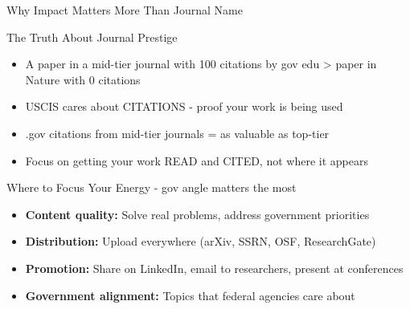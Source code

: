 \documentclass[11pt]{beamer}
\begin{document}
	\begin{frame}{Why Impact Matters More Than Journal Name}
		\scriptsize
		\begin{block}{The Truth About Journal Prestige}
			\begin{itemize}
				\item A paper in a mid-tier journal with 100 citations by gov edu > paper in Nature with 0 citations
				\item USCIS cares about CITATIONS - proof your work is being used
				\item .gov citations from mid-tier journals = as valuable as top-tier
				\item Focus on getting your work READ and CITED, not where it appears
			\end{itemize}
		\end{block}
		\begin{block}{Where to Focus Your Energy - gov angle matters the most}
			\begin{itemize}
				\item \textbf{Content quality:} Solve real problems, address government priorities
				\item \textbf{Distribution:} Upload everywhere (arXiv, SSRN, OSF, ResearchGate)
				\item \textbf{Promotion:} Share on LinkedIn, email to researchers, present at conferences
				\item \textbf{Government alignment:} Topics that federal agencies care about
			\end{itemize}
		\end{block}
	\end{frame}
	
\end{document}
